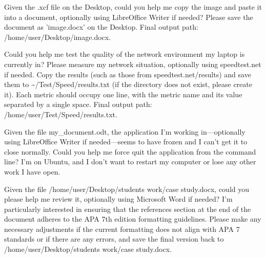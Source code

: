\documentclass{llmxive}
\begin{document}
\begin{instructionbox}
Given the .xcf file on the Desktop, could you help me copy the image and paste it into a document, optionally using LibreOffice Writer if needed? Please save the document as 'image.docx' on the Desktop. Final output path: \textasciigrave{}/home/user/Desktop/image.docx\textasciigrave{}.
\end{instructionbox}

\begin{instructionbox}
Could you help me test the quality of the network environment my laptop is currently in? Please measure my network situation, optionally using speedtest.net if needed. Copy the results (such as those from speedtest.net/results) and save them to \textasciigrave{}\textasciitilde{}/Test/Speed/results.txt\textasciigrave{} (if the directory does not exist, please create it). Each metric should occupy one line, with the metric name and its value separated by a single space. Final output path: \textasciigrave{}/home/user/Test/Speed/results.txt\textasciigrave{}.
\end{instructionbox}

\begin{instructionbox}
Given the file my\_document.odt, the application I'm working in---optionally using LibreOffice Writer if needed---seems to have frozen and I can't get it to close normally. Could you help me force quit the application from the command line? I'm on Ubuntu, and I don't want to restart my computer or lose any other work I have open.
\end{instructionbox}

\begin{instructionbox}
Given the file \textasciigrave{}/home/user/Desktop/students work/case study.docx\textasciigrave{}, could you please help me review it, optionally using Microsoft Word if needed? I'm particularly interested in ensuring that the references section at the end of the document adheres to the APA 7th edition formatting guidelines. Please make any necessary adjustments if the current formatting does not align with APA 7 standards or if there are any errors, and save the final version back to \textasciigrave{}/home/user/Desktop/students work/case study.docx\textasciigrave{}.
\end{instructionbox}
\end{document}
